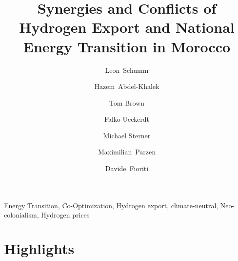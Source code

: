 \documentclass[5p]{elsarticle}
\begin{document}
\begin{frontmatter}

	\title{Synergies and Conflicts of Hydrogen Export and National Energy Transition in Morocco}
    
	\author[tub,oth]{Leon~Schumm}
	\author[ieg]{Hazem~Abdel-Khalek}
	\author[tub]{Tom Brown}
	\author[pik]{Falko Ueckerdt}
	\author[oth]{Michael Sterner}
	\author[uoe]{Maximilian~Parzen}
	\author[unipi]{Davide~Fioriti}


	\address[tub]{Department of Digital Transformation in Energy Systems, Institute of Energy Technology, Technische Universität Berlin, Fakultät III, Einsteinufer 25 (TA 8), 10587 Berlin, Germany}
	\address[oth]{Research Center on Energy Transmission and Storage (FENES), Faculty of Electrical and Information Technology, University of Applied Sciences (OTH) Regensburg, Seybothstrasse 2, 93053 Regensburg, Germany}
	\address[ieg]{Fraunhofer Research Institution for Energy Infrastructures and Geothermal Systems IEG, Cottbus, Germany}
	\address[pik]{Potsdam Institute for Climate Impact Research (PIK), Potsdam, Germany}
	\address[uoe]{University of Edinburgh, Institute for Energy Systems, EH9 3DW Edinburgh, United Kingdom}
	\address[unipi]{University of Pisa, Department of Energy, Systems, Territory and Construction Engineering, Largo Lucio Lazzarino, 56122 Pisa, Italy}

	\begin{abstract}
		
	\end{abstract}

	\begin{keyword}
		Energy Transition, Co-Optimization, Hydrogen export, climate-neutral, Neo-colonialism, Hydrogen prices
	\end{keyword}




\end{frontmatter}



\section*{Highlights}
\end{document}
